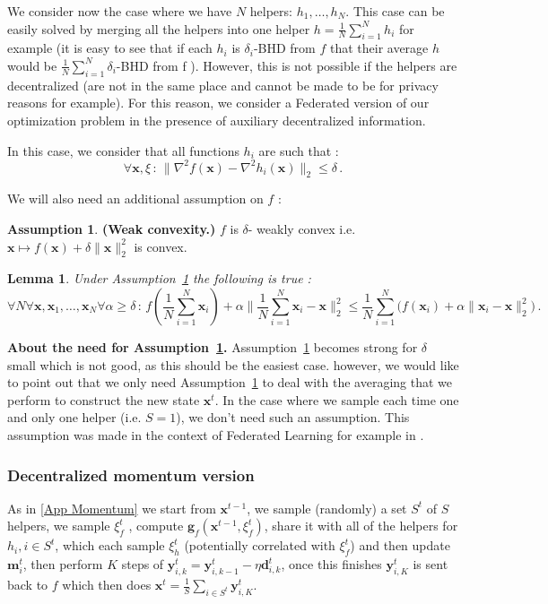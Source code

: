 \documentclass[10pt]{article} %
\theoremstyle{plain}
\newtheorem{lemma}[theorem]{Lemma}
\theoremstyle{definition}
\newtheorem{assumption}[theorem]{Assumption}
\theoremstyle{remark}
\newcommand{\norm}[1]{\|#1\|_2}
\def\vd{{\bm{d}}}
\def\vg{{\bm{g}}}
\def\vm{{\bm{m}}}
\def\vx{{\bm{x}}}
\def\vy{{\bm{y}}}
\begin{document}
We consider now the case where we have $N$ helpers: $h_1, \ldots, h_N$. This case can be easily solved by merging all the helpers into one helper $h = \frac{1}{N} \sum_{i=1}^N h_i$ for example (it is easy to see that if each $h_i$ is $\delta_i$-BHD from $f$ that their average $h$ would be $\frac{1}{N} \sum_{i=1}^N \delta_i$-BHD from f ). However, this is not possible if the helpers are decentralized (are not in the same place and cannot be made to be for privacy reasons for example). For this reason, we consider a Federated version of our optimization problem in the presence of auxiliary decentralized information. 

In this case, we consider that all functions $h_i$ are such that :
$$\forall \vx,\xi\,:\,\norm{\nabla^2 f(\vx) - \nabla^2 h_i(\vx)}\leq \delta\, .$$

We will also need an additional assumption on $f$ :
\begin{assumption}\label{A5}\textbf{(Weak convexity.)} $f$ is $\delta$- weakly convex i.e. $\vx\mapsto f(\vx) + \delta\norm{\vx}^2$ is convex.
\end{assumption}


\begin{lemma}\label{averaging}
Under Assumption~\ref{A5} the following is true :$$\forall N \forall \vx,\vx_1,\ldots, \vx_N \forall \alpha\geq \delta\, : \, f(\frac{1}{N}\sum_{i=1}^N\vx_i) +\alpha\norm{\frac{1}{N}\sum_{i=1}^N\vx_i - \vx}^2 \leq \frac{1}{N}\sum_{i=1}^N \Big( f(\vx_i) +\alpha\norm{\vx_i - \vx}^2 \Big)\, .$$
\end{lemma}

\textbf{About the need for Assumption~\ref{A5}.} Assumption~\ref{A5} becomes strong for $\delta$ small which is not good, as this should be the easiest case. however, we would like to point out that we only need Assumption~\ref{A5} to deal with the averaging that we perform to construct the new state $\vx^t$. In the case where we sample each time one and only one helper (i.e. $S = 1$), we don't need such an assumption. This assumption was made in the context of Federated Learning for example in \citep{MiMe}.


\subsubsection{Decentralized momentum version}

As in \ref{App Momentum} we start from $\vx^{t-1}$, we sample (randomly) a set $S^t$ of $S$ helpers, we sample $\xi_f^t$ , compute $\vg_f(\vx^{t-1},\xi_f^t)$, share it with all of the helpers for $h_i, i\in S^t$, which each sample $\xi_h^t$ (potentially correlated with $\xi_f^t$) and then update $\vm^t_i$, then perform $K$ steps of $\vy^t_{i,k} = \vy^t_{i,k-1} - \eta \vd^t_{i,k}$, once this finishes $\vy^t_{i,K}$ is sent back to $f$ which then does $\vx^t = \frac{1}{S}\sum_{i\in S^t}\vy^t_{i,K}$.
\end{document}
